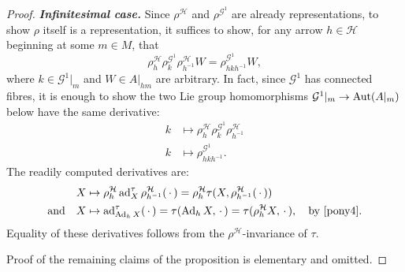 \documentclass[leqno,12pt]{amsart} %
\begin{document}
\begin{proof}{\em \bfseries Infinitesimal case.}
  Since $\rho^{\mathcal H} $ and $\rho^{{\mathcal G}^1}$ are already representations, to
  show $\rho $ itself is a representation, it suffices to show, for any arrow
  $h \in {\mathcal H} $ beginning at some $m \in M$, that
  \begin{equation*}
    \rho^{\mathcal H}_h \rho^{{\mathcal G}^1}_k \rho^{\mathcal H}_{h^{-1}}W = \rho^{{\mathcal G}^1}_{hkh^{-1}}W,
  \end{equation*}
  where $k \in {\mathcal G}^1|_m$ and $W \in A|_{hm}$ are arbitrary. In fact, since
  ${\mathcal G}^1$ has connected fibres, it is enough to show the two Lie group
  homomorphisms ${\mathcal G}^1|_m \rightarrow \operatorname{Aut}(A|_m)$ below have the same
  derivative:
  \begin{align*}
    k &\mapsto  \rho^{\mathcal H}_h \rho^{{\mathcal G}^1}_k \rho^{\mathcal H}_{h^{-1}}\\
    k &\mapsto  \rho^{{\mathcal G}^1}_{hkh^{-1}}.
  \end{align*}
  The readily computed derivatives are:
  \begin{align*}
    X &\mapsto \rho^{\mathcal H}_h \operatorname{ad}^\tau_X \rho^{\mathcal H}_{h^{-1}}(\,\cdot\,)
        = \rho^{\mathcal H}_h \tau(X, \rho^{\mathcal H}_{h^{-1}}(\,\cdot\,))\\
    \text{and}\quad X &\mapsto \operatorname{ad}^\tau_{\operatorname{Ad}_hX}(\,\cdot\,)=\tau(\operatorname{Ad}_hX, \,\cdot\,) =
                        \tau(\rho^{\mathcal H}_h X, \,\cdot\,),\quad\text{by \eqref{pony4}}.
  \end{align*}
  Equality of these derivatives follows from the $\rho^{\mathcal H}$-invariance of $\tau $.

  Proof of the remaining claims of the proposition is elementary and omitted.
\end{proof}

\end{document}
